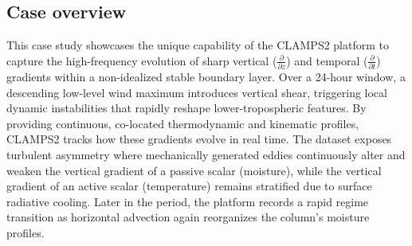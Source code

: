 \documentclass[11pt]{article}
\begin{document}
\subsection*{Case overview}
This case study showcases the unique capability of the CLAMPS2 platform to capture the high-frequency evolution of sharp vertical ($\frac{\partial}{\partial z}$) and temporal ($\frac{\partial}{\partial t}$) gradients within a non-idealized stable boundary layer. Over a 24-hour window, a descending low-level wind maximum introduces vertical shear, triggering local dynamic instabilities that rapidly reshape lower-tropospheric features. By providing continuous, co-located thermodynamic and kinematic profiles, CLAMPS2 tracks how these gradients evolve in real time. The dataset exposes turbulent asymmetry where mechanically generated eddies continuously alter and weaken the vertical gradient of a passive scalar (moisture), while the vertical gradient of an active scalar (temperature) remains stratified due to surface radiative cooling. Later in the period, the platform records a rapid regime transition as horizontal advection again reorganizes the column's moisture profiles.
\end{document}
